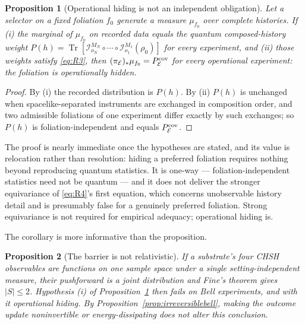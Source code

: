 \documentclass[11pt,a4paper]{article}
\newcommand{\Tr}{\operatorname{Tr}}
\theoremstyle{definition}
\theoremstyle{plain}
\newtheorem{proposition}{Proposition}
\theoremstyle{remark}
\begin{document}
\begin{proposition}[Operational hiding is not an independent obligation]
\label{prop:hiding}
Let a selector on a fixed foliation $f_0$ generate a measure $\mu_{f_0}$
over complete histories. If \textup{(i)} the marginal of $\mu_{f_0}$ on
recorded data equals the quantum composed-history weight
$P(h) = \Tr[\mathcal{I}^{M_N}_{o_N}\circ\cdots\circ
\mathcal{I}^{M_1}_{o_1}(\rho_0)]$ for every experiment, and \textup{(ii)}
those weights satisfy \eqref{eq:R3}, then
$(\pi_{\mathcal{E}})_*\mu_{f_0} = P^{\rm cov}_{\mathcal{E}}$ for every
operational experiment: the foliation is operationally hidden.
\end{proposition}

\begin{proof}
By (i) the recorded distribution is $P(h)$. By (ii) $P(h)$ is unchanged
when spacelike-separated instruments are exchanged in composition order,
and two admissible foliations of one experiment differ exactly by such
exchanges; so $P(h)$ is foliation-independent and equals
$P^{\rm cov}_{\mathcal{E}}$.
\end{proof}

The proof is nearly immediate once the hypotheses are stated, and its
value is relocation rather than resolution: hiding a preferred foliation
requires nothing beyond reproducing quantum statistics. It is one-way ---
foliation-independent statistics need not be quantum --- and it does not
deliver the stronger equivariance of \eqref{eq:R4}'s first equation,
which concerns unobservable history detail and is presumably false for a
genuinely preferred foliation. Strong equivariance is not required for
empirical adequacy; operational hiding is.

The corollary is more informative than the proposition.

\begin{proposition}[The barrier is not relativistic]
\label{prop:barrier}
If a substrate's four CHSH observables are functions on one sample space
under a single setting-independent measure, their pushforward is a joint
distribution and Fine's theorem gives $|S|\le2$. Hypothesis \textup{(i)}
of Proposition~\ref{prop:hiding} then fails on Bell experiments, and with
it operational hiding. By Proposition~\ref{prop:irreversiblebell}, making
the outcome update noninvertible or energy-dissipating does not alter this
conclusion.
\end{proposition}
\end{document}
